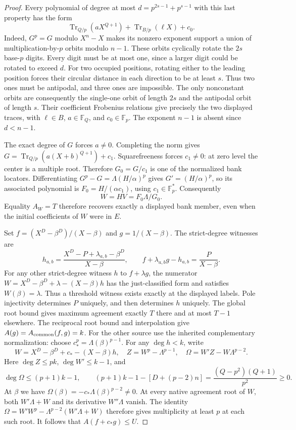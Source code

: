\begin{proof}
Every polynomial of degree at most
$d=p^{2s-1}+p^{s-1}$ with this last property has the form
\[
 \operatorname{Tr}_{Q/p}(aX^{Q+1})
 +\operatorname{Tr}_{B/p}(\ell X)+c_0.
\]
Indeed, $G^p=G$ modulo $X^n-X$ makes its nonzero exponent
support a union of multiplication-by-$p$ orbits modulo $n-1$.
These orbits cyclically rotate the $2s$ base-$p$ digits.
Every digit must be at most one, since a larger digit could
be rotated to exceed $d$. For two occupied positions, rotating
either to the leading position forces their circular distance
in each direction to be at least $s$. Thus two ones must be
antipodal, and three ones are impossible. The only nonconstant
orbits are consequently the single-one orbit of length $2s$
and the antipodal orbit of length $s$. Their coefficient
Frobenius relations give precisely the two displayed traces,
with $\ell\in B$, $a\in\mathbb F_Q$, and $c_0\in\mathbb F_p$.
The exponent $n-1$ is absent since $d<n-1$.

The exact degree of $G$ forces $a\ne0$. Completing the norm
gives
$G=\operatorname{Tr}_{Q/p}(a(X+b)^{Q+1})+c_1$.
Squarefreeness forces $c_1\ne0$: at zero level the center is a
multiple root. Therefore $G_0=G/c_1$ is one of the normalized
bank locators. Differentiating $G^p-G=\Lambda(H/\alpha)^p$ gives
$G'=(H/\alpha)^p$, so its associated polynomial is
$F_0=H/(\alpha c_1)$, using $c_1\in\mathbb F_p^*$. Consequently
\[
 W=HV=F_0\Lambda/G_0.
\]
Equality $A_W=T$ therefore recovers exactly a displayed bank
member, even when the initial coefficients of $W$ were in $E$.

Set $f=(X^D-\beta^D)/(X-\beta)$ and $g=1/(X-\beta)$.
The strict-degree witnesses are
\[
 h_{a,b}=\frac{X^D-P+\lambda_{a,b}-\beta^D}{X-\beta},
 \qquad f+\lambda_{a,b}g-h_{a,b}=\frac{P}{X-\beta}.
\]
For any other strict-degree witness $h$ to $f+\lambda g$,
the numerator
$W=X^D-\beta^D+\lambda-(X-\beta)h$
has the just-classified form and satisfies $W(\beta)=\lambda$.
Thus a threshold witness exists exactly at the displayed labels.
Pole injectivity determines $P$ uniquely, and then determines
$h$ uniquely. The global root bound gives maximum agreement
exactly $T$ there and at most $T-1$ elsewhere.
The reciprocal root bound and interpolation give
$A(g)=A_{\rm common}(f,g)=k$.
For the other source use the inherited complementary normalization:
choose $c_*^p=\Lambda(\beta)^{p-1}$.
For any $\deg h<k$, write
\[
 W=X^D-\beta^D+c_*-(X-\beta)h,\quad
 Z=W^p-\Lambda^{p-1},\quad
 \Omega=W'Z-W\Lambda^{p-2}.
\]
Here $\deg Z\le pk$, $\deg W'\le k-1$, and
\[
 \deg\Omega\le(p+1)k-1,\qquad
 (p+1)k-1-[D+(p-2)n]=\frac{(Q-p^2)(Q+1)}{p^2}\ge0.
\]
At $\beta$ we have
$\Omega(\beta)=-c_*\Lambda(\beta)^{p-2}\ne0$.
At every native agreement root of $W$, both
$W'\Lambda+W$ and its derivative $W''\Lambda$ vanish.
The identity
$\Omega=W'W^p-\Lambda^{p-2}(W'\Lambda+W)$
therefore gives multiplicity at least $p$ at each such root.
It follows that $A(f+c_*g)\le U$.


\end{proof}
